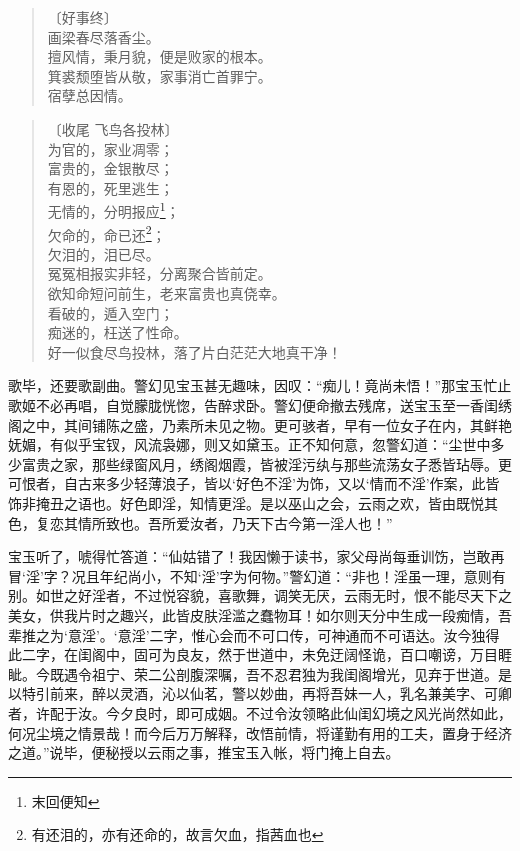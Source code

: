 \documentclass[12pt,oneside]{book}
\newenvironment{shici}{%
\begin{verse}%
\centering\large\hspace{12pt}}%
{\end{verse}}
\begin{document}
\begin{shici}
〔好事终〕\\
画梁春尽落香尘。\\
擅风情，秉月貌，便是败家的根本。\\
箕裘颓堕皆从敬，家事消亡首罪宁。\\
宿孽总因情。
\end{shici}

\begin{shici}
〔收尾 飞鸟各投林〕\\
为官的，家业凋零；\\
富贵的，金银散尽；\\
有恩的，死里逃生；\\
无情的，分明报应\footnote{末回便知}；\\
欠命的，命已还\footnote{有还泪的，亦有还命的，故言欠血，指茜血也}；\\
欠泪的，泪已尽。\\
冤冤相报实非轻，分离聚合皆前定。\\
欲知命短问前生，老来富贵也真侥幸。\\
看破的，遁入空门；\\
痴迷的，枉送了性命。\\
好一似食尽鸟投林，落了片白茫茫大地真干净！
\end{shici}


歌毕，还要歌副曲。警幻见宝玉甚无趣味，因叹：“痴儿！竟尚未悟！”那宝玉忙止歌姬不必再唱，自觉朦胧恍惚，告醉求卧。警幻便命撤去残席，送宝玉至一香闺绣阁之中，其间铺陈之盛，乃素所未见之物。更可骇者，早有一位女子在内，其鲜艳妩媚，有似乎宝钗，风流袅娜，则又如黛玉。正不知何意，忽警幻道：“尘世中多少富贵之家，那些绿窗风月，绣阁烟霞，皆被淫污纨与那些流荡女子悉皆玷辱。更可恨者，自古来多少轻薄浪子，皆以‘好色不淫’为饰，又以‘情而不淫’作案，此皆饰非掩丑之语也。好色即淫，知情更淫。是以巫山之会，云雨之欢，皆由既悦其色，复恋其情所致也。吾所爱汝者，乃天下古今第一淫人也！”

宝玉听了，唬得忙答道：“仙姑错了！我因懒于读书，家父母尚每垂训饬，岂敢再冒‘淫’字？况且年纪尚小，不知‘淫’字为何物。”警幻道：“非也！淫虽一理，意则有别。如世之好淫者，不过悦容貌，喜歌舞，调笑无厌，云雨无时，恨不能尽天下之美女，供我片时之趣兴，此皆皮肤淫滥之蠢物耳！如尔则天分中生成一段痴情，吾辈推之为‘意淫’。‘意淫’二字，惟心会而不可口传，可神通而不可语达。汝今独得此二字，在闺阁中，固可为良友，然于世道中，未免迂阔怪诡，百口嘲谤，万目睚眦。今既遇令祖宁、荣二公剖腹深嘱，吾不忍君独为我闺阁增光，见弃于世道。是以特引前来，醉以灵酒，沁以仙茗，警以妙曲，再将吾妹一人，乳名兼美字、可卿者，许配于汝。今夕良时，即可成姻。不过令汝领略此仙闺幻境之风光尚然如此，何况尘境之情景哉！而今后万万解释，改悟前情，将谨勤有用的工夫，置身于经济之道。”说毕，便秘授以云雨之事，推宝玉入帐，将门掩上自去。
\end{document}
